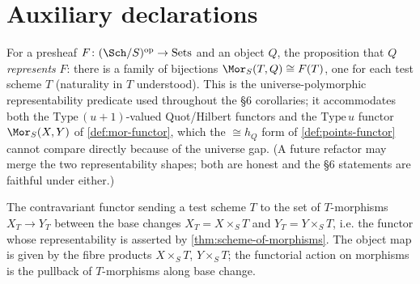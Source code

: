 \section{Auxiliary declarations}

\begin{definition}

  \label{def:represents-functor}
  For a presheaf $F\colon(\Sch/S)^{\mathrm{op}}\to\mathrm{Sets}$ and an object
  $Q$, the proposition that $Q$ \emph{represents} $F$: there is a family of
  bijections $\Mor_S(T,Q)\cong F(T)$, one for each test scheme $T$ (naturality in
  $T$ understood). This is the universe-polymorphic representability predicate
  used throughout the §6 corollaries; it accommodates both the
  $\mathrm{Type}\,(u+1)$-valued Quot/Hilbert functors and the $\mathrm{Type}\,u$
  functor $\Mor_S(X,Y)$ of \cref{def:mor-functor}, which the
  $\cong h_Q$ form of \cref{def:points-functor} cannot compare directly because
  of the universe gap. (A future refactor may merge the two representability
  shapes; both are honest and the §6 statements are faithful under either.)
\end{definition}

\begin{definition}

  \label{def:mor-functor}
  The contravariant functor sending a test scheme $T$ to the set of
  $T$-morphisms $X_T\to Y_T$ between the base changes
  $X_T = X\times_S T$ and $Y_T = Y\times_S T$, i.e. the functor whose
  representability is asserted by \cref{thm:scheme-of-morphisms}. The object map
  is given by the fibre products $X\times_S T$, $Y\times_S T$; the functorial
  action on morphisms is the pullback of $T$-morphisms along base change.
\end{definition}
